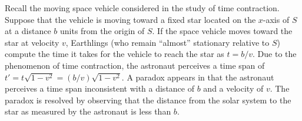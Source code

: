 \begin{ex}\label{ex:6.9.9}
  Recall the moving space vehicle considered in the study of time contraction.
  Suppose that the vehicle is moving toward a fixed star located on the \(x\)-axis of \(S\) at a distance \(b\) units from the origin of \(S\).
  If the space vehicle moves toward the star at velocity \(v\), Earthlings (who remain ``almost'' stationary relative to \(S\)) compute the time it takes for the vehicle to reach the star as \(t = b / v\).
  Due to the phenomenon of time contraction, the astronaut perceives a time span of \(t' = t \sqrt{1 - v^2} = (b / v) \sqrt{1 - v^2}\).
  A paradox appears in that the astronaut perceives a time span inconsistent with a distance of \(b\) and a velocity of \(v\).
  The paradox is resolved by observing that the distance from the solar system to the star as measured by the astronaut is less than \(b\).


\end{ex}
